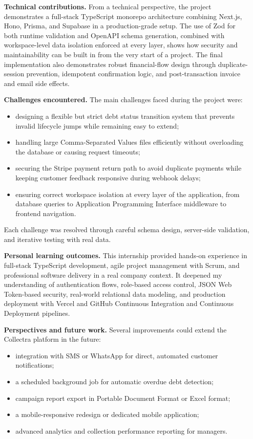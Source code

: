 \documentclass[12pt,a4paper]{report}
\begin{document}
\textbf{Technical contributions.}
From a technical perspective, the project demonstrates a full-stack TypeScript
monorepo architecture combining Next.js, Hono, Prisma, and Supabase in a
production-grade setup.
The use of Zod for both runtime validation and OpenAPI schema generation, combined
with workspace-level data isolation enforced at every layer, shows how security and
maintainability can be built in from the very start of a project.
The final implementation also demonstrates robust financial-flow design through
duplicate-session prevention, idempotent confirmation logic, and post-transaction
invoice and email side effects.

\textbf{Challenges encountered.}
The main challenges faced during the project were:
\begin{itemize}
  \item designing a flexible but strict debt status transition system that prevents
        invalid lifecycle jumps while remaining easy to extend;
  \item handling large Comma-Separated Values files efficiently without overloading the database
        or causing request timeouts;
  \item securing the Stripe payment return path to avoid duplicate payments while
        keeping customer feedback responsive during webhook delays;
  \item ensuring correct workspace isolation at every layer of the application,
        from database queries to Application Programming Interface middleware to frontend navigation.
\end{itemize}
Each challenge was resolved through careful schema design, server-side validation,
and iterative testing with real data.

\textbf{Personal learning outcomes.}
This internship provided hands-on experience in full-stack TypeScript development,
agile project management with Scrum, and professional software delivery in a real
company context.
It deepened my understanding of authentication flows, role-based access control,
JSON Web Token-based security, real-world relational data modeling, and production deployment
with Vercel and GitHub Continuous Integration and Continuous Deployment pipelines.

\textbf{Perspectives and future work.}
Several improvements could extend the Collectra platform in the future:
\begin{itemize}
  \item integration with SMS or WhatsApp for direct, automated customer notifications;
  \item a scheduled background job for automatic overdue debt detection;
  \item campaign report export in Portable Document Format or Excel format;
  \item a mobile-responsive redesign or dedicated mobile application;
  \item advanced analytics and collection performance reporting for managers.
\end{itemize}
\end{document}
